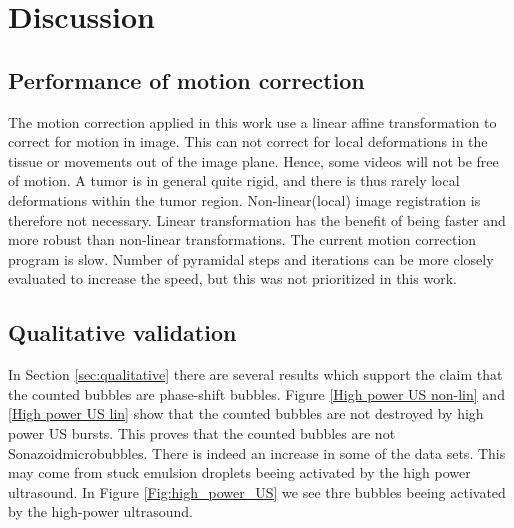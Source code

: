 \section{Discussion}
\subsection{Performance of motion correction}
The motion correction applied in this work use a linear affine transformation to correct for motion in image. This can not correct for local deformations in the tissue or movements out of the image plane. Hence, some videos will not be free of motion. A tumor is in general quite rigid, and there is thus rarely local deformations within the tumor region. Non-linear(local) image registration is therefore not necessary. Linear transformation has the benefit of being faster and more robust than non-linear transformations. The current motion correction program is slow. Number of pyramidal steps and iterations can be more closely evaluated to increase the speed, but this was not prioritized in this work. 

\subsection{Qualitative validation}
In Section \ref{sec:qualitative} there are several results which support the claim that the counted bubbles are phase-shift bubbles. Figure \ref{High power US non-lin} and \ref{High power US lin} show that the counted bubbles are not destroyed by high power US bursts. This proves that the counted bubbles are not Sonazoid\texttrademark microbubbles. There is indeed an increase in some of the data sets. This may come from stuck emulsion droplets beeing activated by the high power ultrasound. In Figure \ref{Fig:high_power_US} we see thre bubbles beeing activated by the high-power ultrasound.

